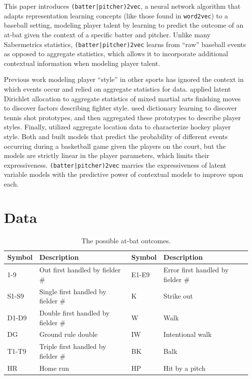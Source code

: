 \documentclass{article}
\begin{document}
This paper introduces \texttt{(batter|pitcher)2vec}, a neural network algorithm that adapts representation learning concepts (like those found in \texttt{word2vec}) to a baseball setting, modeling player talent by learning to predict the outcome of an at-bat given the context of a specific batter and pitcher. Unlike many Sabermetrics statistics, \texttt{(batter|pitcher)2vec} learns from ``raw'' baseball events as opposed to aggregate statistics, which allows it to incorporate additional contextual information when modeling player talent.

Previous work modeling player ``style'' in other sports has ignored the context in which events occur and relied on aggregate statistics for data. \parencite{Hackett2017} applied latent Dirichlet allocation to aggregate statistics of mixed martial arts finishing moves to discover factors describing fighter style. \parencite{Wei2016} used dictionary learning to discover tennis shot prototypes, and then aggregated these prototypes to describe player styles. Finally, \parencite{Schulte2017} utilized aggregate location data to characterize hockey player style. Both \parencite{Oh2015} and \parencite{Kuehn2016} built models that predict the probability of different events occurring during a basketball game given the players on the court, but the models are strictly linear in the player parameters, which limits their expressiveness. \texttt{(batter|pitcher)2vec} marries the expressiveness of latent variable models with the predictive power of contextual models to improve upon each.

\section{Data}
\label{data}

\begin{table}[h]
\caption{The possible at-bat outcomes.}
\centering
\begin{adjustbox}{max width=\textwidth}
    \begin{tabular}{ | l | l | l | l | }
    \hline
    Symbol & Description & Symbol & Description \\ 
    \hline\hline
    1-9 & Out first handled by fielder \# & E1-E9 & Error first handled by fielder \# \\
    \hline
    S1-S9 & Single first handled by fielder \# & K & Strike out \\
    \hline
    D1-D9 & Double first handled by fielder \# & W & Walk \\
    \hline
    DG & Ground rule double & IW & Intentional walk \\
    \hline
    T1-T9 & Triple first handled by fielder \# & BK & Balk \\
    \hline
    HR & Home run & HP & Hit by a pitch \\
    \hline
    \end{tabular}
\end{adjustbox}
\label{table:at_bats}
\end{table}
\end{document}
